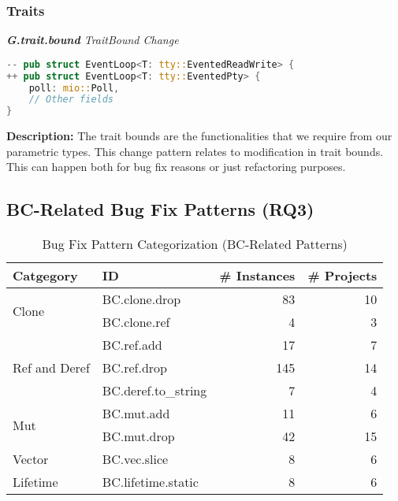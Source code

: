 \subsubsection{Traits}
\noindent\textit{\textbf{G.trait.bound} TraitBound Change}

\begin{lstlisting}[language=Rust, style=colouredRust]
-- pub struct EventLoop<T: tty::EventedReadWrite> {
++ pub struct EventLoop<T: tty::EventedPty> {
    poll: mio::Poll,
    // Other fields
}

\end{lstlisting}

\noindent\textbf{Description:} The trait bounds are the functionalities that we require from our parametric types. This change pattern relates to modification in trait bounds. This can happen both for bug fix reasons or just refactoring purposes.

\subsection{\label{sec:bc_patterns}BC-Related Bug Fix Patterns (RQ3)}

\begin{table}[]
\begin{tabular}{l|l|r|r}
\textbf{Catgegory} & \textbf{ID} & \textbf{\# Instances} & \textbf{\# Projects} \\
\hline
\multirow{2}{*}{Clone}                                         & BC.clone.drop & 83 & 10 \\
& BC.clone.ref & 4 & 3   
\\\cline{1-4}
\multirow{3}{*}{Ref and Deref} & BC.ref.add & 17 & 7 \\
& BC.ref.drop & 145 & 14 \\
& BC.deref.to\_string  & 7 & 4                                            \\\cline{1-4}
\multirow{2}{*}{Mut} & BC.mut.add  & 11 & 6 \\
& BC.mut.drop  & 42 & 15                               \\\cline{1-4}
Vector & BC.vec.slice  & 8 & 6                                    \\\cline{1-4}
\multirow{1}{*}{Lifetime}      
& BC.lifetime.static  & 8 & 6
\\
\end{tabular}
\caption{\label{table:bc}Bug Fix Pattern Categorization (BC-Related Patterns)}
\end{table}
    

